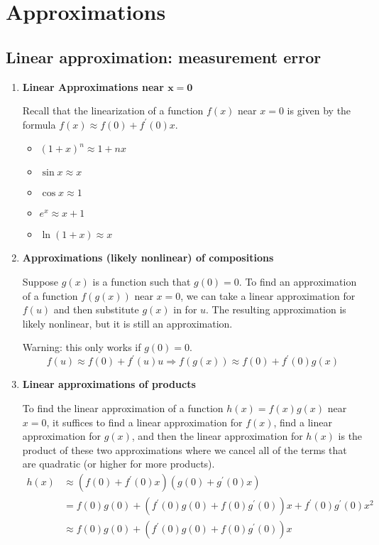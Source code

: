 \chapter{Approximations}
\section{Linear approximation: measurement error}
\begin{enumerate}
    \item \textbf{Linear Approximations near $\bm{x=0}$}

        Recall that the linearization of a function $f(x)$ near $x=0$ is given by the formula $f(x)\approx f(0)+f^\prime (0)x$.
        \begin{itemize}
            \item $(1+x)^n\approx 1+nx$
            \item $\sin x\approx x$
            \item $\cos x\approx 1$
            \item $e^x\approx x+1$
            \item $\ln(1+x)\approx x$
        \end{itemize}
    \item \textbf{Approximations (likely nonlinear) of compositions}

        Suppose $g(x)$ is a function such that $g(0)=0$. To find an approximation of a function $f(g(x))$ near $x=0$, we can take a linear approximation for $f(u)$ and then substitute $g(x)$ in for $u$. The resulting approximation is likely nonlinear, but it is still an approximation.

        Warning: this only works if $g(0)=0$.
        $$
            f(u)\approx f(0)+f^\prime (u)u\Rightarrow f(g(x))\approx f(0)+f^\prime (0)g(x)
        $$
    \item \textbf{Linear approximations of products}

        To find the linear approximation of a function $h(x)=f(x)g(x)$ near $x=0$, it suffices to find a linear approximation for $f(x)$, find a linear approximation for $g(x)$, and then the linear approximation for $h(x)$ is the product of these two approximations where we cancel all of the terms that are quadratic (or higher for more products).
		\begin{align*}
            h(x) & \approx (f(0)+f^\prime (0)x)(g(0)+g^\prime (0)x) \\
                 & =f(0)g(0)+(f^\prime (0)g(0)+f(0)g^\prime (0))x+f^\prime (0)g^\prime (0)x^2 \\
                 & \approx f(0)g(0)+(f^\prime (0)g(0)+f(0)g^\prime (0))x
        \end{align*}
\end{enumerate}
